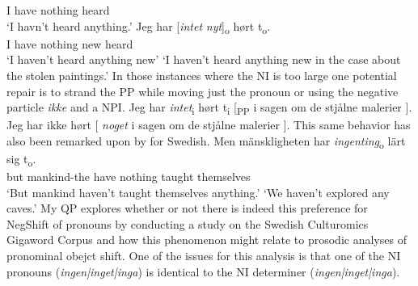 \documentclass[12pt, letterpaper]{article}
\begin{document}
	I have nothing heard\\
	\glt  `I havn't heard anything.'
	\ex 
	\gll Jeg har [\textit{intet} \textit{nyt}]\textsubscript{o} hørt t\textsubscript{o}.\\
	I have nothing new heard\\
	\glt `I haven't heard anything new'
	\glt `I haven't heard anything new in the case about the stolen paintings.'
	\z
\ex In those instances where the NI is too large one potential repair is to strand the PP while moving just the pronoun or using the negative particle \textit{ikke} and a NPI.
	\ea Jeg har \textit{intet}\textsubscript{i} hørt t\textsubscript{i} [\textsubscript{PP} i sagen om de stjålne malerier ].
	\ex Jeg har ikke hørt [ \textit{noget} i sagen om de stjålne malerier ].
	\z   
\ex This same behavior has also been remarked upon by \citet{penkaNegativeIndefinites2011} for Swedish.
	\ea 
	\gll Men mänskligheten har \textit{ingenting}\textsubscript{o} lärt sig t\textsubscript{o}.\\
	but mankind-the have nothing taught themselves\\
	\glt `But mankind haven't taught themselves anything.'
	\glt `We haven't explored any caves.'
	\z 
\ex My QP explores whether or not there is indeed this preference for NegShift of pronouns by conducting a study on the Swedish Culturomics Gigaword Corpus \citep{eideSwedishCulturomicsGigaword2016} and how this phenomenon might relate to prosodic analyses of pronominal obejct shift.
\ex One of the issues for this analysis is that one of the NI pronouns (\textit{ingen|inget|inga}) is identical to the NI determiner (\textit{ingen|inget|inga}).
\z 

\end{document}
